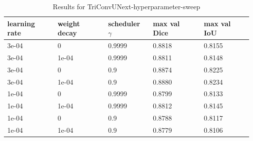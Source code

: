 \begin{table}
\caption{Results for TriConvUNext-hyperparameter-sweep}
\label{tab-TriConvUNext-hyperparameter-sweep_table}
\begin{tabular}{lllll}
\toprule
learning rate & weight decay & scheduler $\gamma$ & max val Dice & max val IoU \\
\midrule
3e-04 & 0 & 0.9999 & 0.8818 & 0.8155 \\
3e-04 & 1e-04 & 0.9999 & 0.8811 & 0.8148 \\
3e-04 & 0 & 0.9 & 0.8874 & 0.8225 \\
3e-04 & 1e-04 & 0.9 & 0.8880 & 0.8234 \\
1e-04 & 0 & 0.9999 & 0.8799 & 0.8133 \\
1e-04 & 1e-04 & 0.9999 & 0.8812 & 0.8145 \\
1e-04 & 0 & 0.9 & 0.8788 & 0.8117 \\
1e-04 & 1e-04 & 0.9 & 0.8779 & 0.8106 \\
\bottomrule
\end{tabular}
\end{table}
